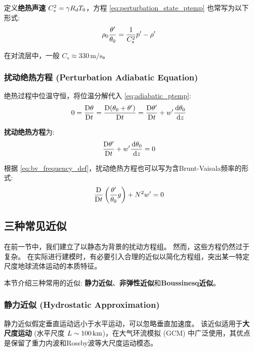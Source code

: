定义\textbf{绝热声速} $C_s^2 = \gamma R_d T_0$，方程 \eqref{eq:perturbation_state_ptemp} 也常写为以下形式:
\begin{equation}
    \rho_0 \frac{\theta^\prime}{\theta_0} = \frac{1}{C_s^2} p^\prime - \rho^\prime
    \label{eq:perturbation_state_cs}
\end{equation}

在对流层中，一般 $C_s \approx 330\,\mathrm{m/s}$。

\subsubsection{扰动绝热方程 (Perturbation Adiabatic Equation)}

绝热过程中位温守恒，将位温分解代入 \eqref{eq:adiabatic_ptemp}:
\begin{equation*}
    0 = \matderiv{\ptemp} = \matderiv{(\ptemp_0 + \ptemp^\prime)} = \matderiv{\ptemp^\prime} + w^\prime \ode{\ptemp_0}{z}
\end{equation*}

\textbf{扰动绝热方程}为:
\begin{equation}
    \matderiv{\ptemp^\prime} + w^\prime \ode{\ptemp_0}{z} = 0
    \label{eq:perturbation_adiabatic_ptemp}
\end{equation}

根据 \eqref{eq:bv_frequency_def}，扰动绝热方程也可以写为含Brunt-Vaisala频率的形式:
\begin{equation}
    \frac{\mathrm{D} }{\mathrm{D} t}\left(\frac{\theta^\prime}{\theta_0} g\right) + N^2 w^\prime = 0
    \label{eq:perturbation_buoyancy}
\end{equation}

\subsection{三种常见近似}

在前一节中，我们建立了以静态为背景的扰动方程组。
然而，这些方程仍然过于复杂。
在实际进行建模时，有必要引入合理的近似以简化方程组，突出某一特定尺度地球流体运动的本质特征。

本节介绍三种常用的近似: \textbf{静力近似}、\textbf{非弹性近似}和\textbf{Boussinesq近似}。

\subsubsection{静力近似 (Hydrostatic Approximation)}

静力近似假定垂直运动远小于水平运动，可以忽略垂直加速度。
该近似适用于\textbf{大尺度运动} (水平尺度 $L \sim 100\,\mathrm{km}$)，在大气环流模拟 (GCM) 中广泛使用，其优点是保留了重力内波和Rossby波等大尺度运动模态。


